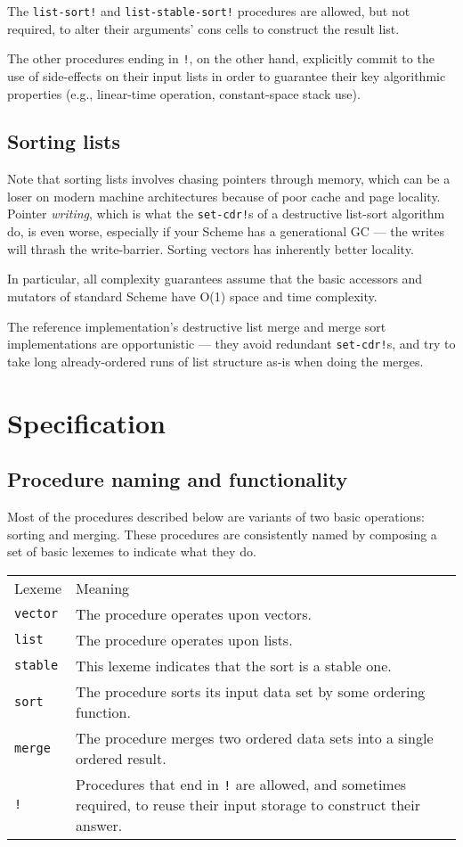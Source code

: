 The \texttt{list-sort!} and \texttt{list-stable-sort!} procedures are
allowed, but not required, to alter their arguments' cons cells to
construct the result list.

The other procedures ending in \texttt{!}, on the other hand, explicitly
commit to the use of side-effects on their input lists in order to
guarantee their key algorithmic properties (e.g., linear-time operation,
constant-space stack use).

\subsection{Sorting lists}\label{Sortinglists}

Note that sorting lists involves chasing pointers through memory, which
can be a loser on modern machine architectures because of poor cache and
page locality. Pointer \emph{writing}, which is what the
\texttt{set-cdr!}s of a destructive list-sort algorithm do, is even
worse, especially if your Scheme has a generational GC --- the writes
will thrash the write-barrier. Sorting vectors has inherently better
locality.

In particular, all complexity guarantees assume that the basic accessors
and mutators of standard Scheme have O(1) space and time complexity.

The reference implementation's destructive list merge and merge sort
implementations are opportunistic --- they avoid redundant
\texttt{set-cdr!}s, and try to take long already-ordered runs of list
structure as-is when doing the merges.

\section{Specification}\label{specification}

\subsection{Procedure naming and
functionality}\label{Procedurenamingandfunctionality}

Most of the procedures described below are variants of two basic
operations: sorting and merging. These procedures are consistently named
by composing a set of basic lexemes to indicate what they do.

\begin{longtable}[]{@{}ll@{}}
\toprule
Lexeme & Meaning\tabularnewline
\texttt{vector} & The procedure operates upon vectors.\tabularnewline
\texttt{list} & The procedure operates upon lists.\tabularnewline
\texttt{stable} & This lexeme indicates that the sort is a stable
one.\tabularnewline
\texttt{sort} & The procedure sorts its input data set by some ordering
function.\tabularnewline
\texttt{merge} & The procedure merges two ordered data sets into a
single ordered result.\tabularnewline
\texttt{!} & Procedures that end in \texttt{!} are allowed, and
sometimes required, to reuse their input storage to construct their
answer.\tabularnewline
\bottomrule
\end{longtable}

